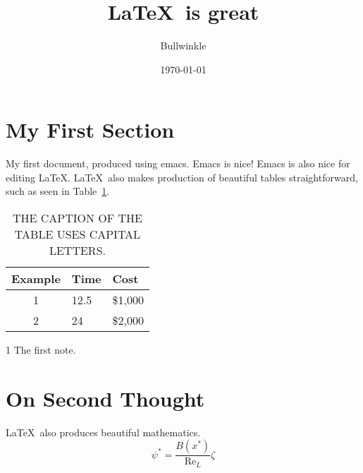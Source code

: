 \documentclass{article}
\begin{document}
\title{\LaTeX\ is great}
\author{Bullwinkle}
\date{\today}
\maketitle

\tableofcontents
\listoftables

\section{My First Section}

My first document, produced using emacs.  Emacs is nice!
Emacs is also nice for editing \LaTeX.  \LaTeX\ also makes production
of beautiful tables straightforward, such as seen in
Table~\ref{tbl:tbl02}. %
\begin{table}[t]
\begin{threeparttable}
  \caption{THE CAPTION OF THE TABLE USES CAPITAL LETTERS.}
  \label{tbl:tbl02}
  \begin{center}
\begin{tabular*}{\textwidth}{c l l} %
  \hline
  Example & Time\tnote{1} & Cost \\
  \hline
  1 & 12.5 & \$1,000 \\
  2 & 24 & \$2,000 \\
  \hline
\end{tabular*}
\begin{tablenotes}
  \item [1] The first note.
\end{tablenotes}
  \end{center}
\end{threeparttable}
\end{table}

\section{On Second Thought}

\LaTeX\ also  produces beautiful mathematics.
\begin{equation}
\psi^\ast = \frac{B(x^\ast)}{\mathrm{Re}_L}\zeta
\end{equation}
\end{document}
